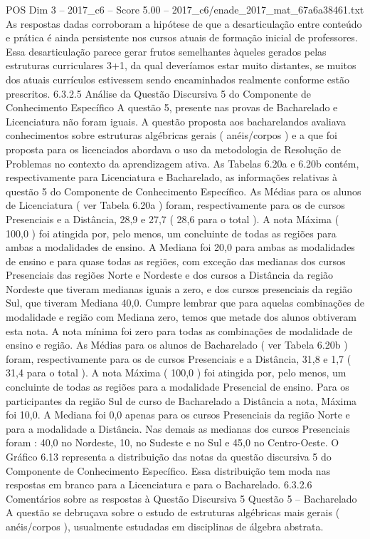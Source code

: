 \begin{textsample}{POS Dim 3 – 2017\_c6 – Score 5.00 – 2017\_c6/enade\_2017\_mat\_67a6a38461.txt}
As respostas dadas corroboram a hipótese de que a desarticulação entre conteúdo e prática é ainda persistente nos cursos atuais de formação inicial de professores.
Essa desarticulação parece gerar frutos semelhantes àqueles gerados pelas estruturas curriculares 3+1, da qual deveríamos estar muito distantes, se muitos dos atuais currículos estivessem sendo encaminhados realmente conforme estão prescritos. 6.3.2.5 Análise da Questão Discursiva 5 do Componente de Conhecimento Específico A questão 5, presente nas provas de Bacharelado e Licenciatura não foram iguais.
A questão proposta aos bacharelandos avaliava conhecimentos sobre estruturas algébricas gerais ( anéis/corpos ) e a que foi proposta para os licenciados abordava o uso da metodologia de Resolução de Problemas no contexto da aprendizagem ativa.
As Tabelas 6.20a e 6.20b contém, respectivamente para Licenciatura e Bacharelado, as informações relativas à questão 5 do Componente de Conhecimento Específico.
As Médias para os alunos de Licenciatura ( ver Tabela 6.20a ) foram, respectivamente para os de cursos Presenciais e a Distância, 28,9 e 27,7 ( 28,6 para o total ).
A nota Máxima ( 100,0 ) foi atingida por, pelo menos, um concluinte de todas as regiões para ambas a modalidades de ensino.
A Mediana foi 20,0 para ambas as modalidades de ensino e para quase todas as regiões, com exceção das medianas dos cursos Presenciais das regiões Norte e Nordeste e dos cursos a Distância da região Nordeste que tiveram medianas iguais a zero, e dos cursos presenciais da região Sul, que tiveram Mediana 40,0.
Cumpre lembrar que para aquelas combinações de modalidade e região com Mediana zero, temos que metade dos alunos obtiveram esta nota.
A nota mínima foi zero para todas as combinações de modalidade de ensino e região.
As Médias para os alunos de Bacharelado ( ver Tabela 6.20b ) foram, respectivamente para os de cursos Presenciais e a Distância, 31,8 e 1,7 ( 31,4 para o total ).
A nota Máxima ( 100,0 ) foi atingida por, pelo menos, um concluinte de todas as regiões para a modalidade Presencial de ensino.
Para os participantes da região Sul de curso de Bacharelado a Distância a nota, Máxima foi 10,0.
A Mediana foi 0,0 apenas para os cursos Presenciais da região Norte e para a modalidade a Distância.
Nas demais as medianas dos cursos Presenciais foram : 40,0 no Nordeste, 10, no Sudeste e no Sul e 45,0 no Centro-Oeste.
O Gráfico 6.13 representa a distribuição das notas da questão discursiva 5 do Componente de Conhecimento Específico.
Essa distribuição tem moda nas respostas em branco para a Licenciatura e para o Bacharelado. 6.3.2.6 Comentários sobre as respostas à Questão Discursiva 5 Questão 5 – Bacharelado A questão se debruçava sobre o estudo de estruturas algébricas mais gerais ( anéis/corpos ), usualmente estudadas em disciplinas de álgebra abstrata.

\end{textsample}
